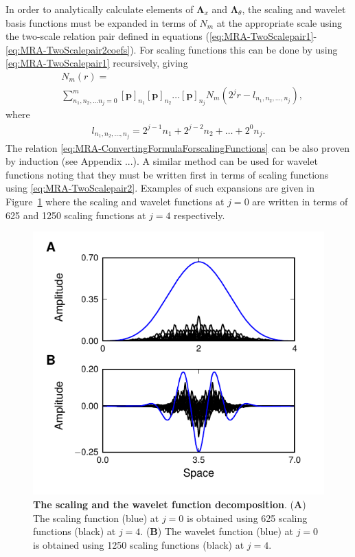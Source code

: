 \documentclass[11pt,draftcls,onecolumn,peerreview]{IEEEtran}
\begin{document}
In order to analytically calculate elements of $\boldsymbol\Lambda_{x}$ and $\boldsymbol\Lambda_{\theta}$, the scaling and wavelet basis functions must be expanded in terms of $N_m$ at the appropriate scale using the two-scale relation pair defined in equations (\ref{eq:MRA-TwoScalepair1}-\ref{eq:MRA-TwoScalepair2coefs}). For scaling functions this can be done  by using \eqref{eq:MRA-TwoScalepair1} recursively, giving
\begin{align}\label{eq:MRA-ConvertingFormulaForscalingFunctions}
 &N_m(r)=\nonumber \\
&\sum_{n_1,n_2, \dots n_j=0}^{m}\left[\mathbf p\right]_{n_1} \left[\mathbf p\right]_{n_2}\dots \left[\mathbf p\right]_{n_j}N_m(2^jr-l_{n_1,n_2, \dots, n_j}),
\end{align}
where 
\begin{align}
 l_{n_1,n_2, \dots, n_j}=2^{j-1}n_1+2^{j-2}n_2+ \dots +2^{0}n_j.
\end{align}
The relation \eqref{eq:MRA-ConvertingFormulaForscalingFunctions} can be also proven by induction (see Appendix ...). A similar method can be used for wavelet functions noting that they must be written first in terms of scaling functions using \eqref{eq:MRA-TwoScalepair2}. Examples of such expansions are given in Figure~\ref{fig:MRA-BasisDecomposition} where the scaling and wavelet functions at $j=0$ are written in terms of 625 and 1250 scaling functions at $j=4$ respectively.
\begin{figure}[!t] 
 	\centering
 		\includegraphics[scale=1]{./Graph/Decomposition.pdf}
 		\caption{{\bf The scaling and the wavelet function decomposition}. (\textbf{A}) The scaling function (blue) at $j=0$ is obtained using 625 scaling functions (black) at $j=4$. (\textbf{B}) The wavelet function (blue) at $j=0$ is obtained using 1250 scaling functions (black) at $j=4$.}
 	\label{fig:MRA-BasisDecomposition}
 \end{figure}  
\end{document}
